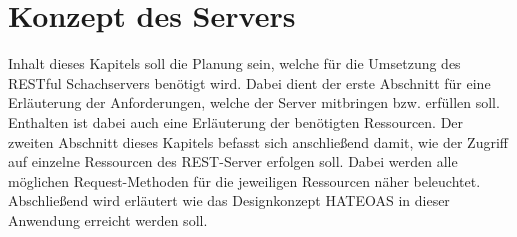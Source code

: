 
\chapter{Konzept des Servers}\label{sec:conceptServer}
Inhalt dieses Kapitels soll die Planung sein, welche für die Umsetzung des RESTful Schachservers benötigt wird. Dabei dient der erste Abschnitt für eine Erläuterung der Anforderungen, welche der Server mitbringen bzw. erfüllen soll. Enthalten ist dabei auch eine Erläuterung der benötigten Ressourcen. Der zweiten Abschnitt dieses Kapitels befasst sich anschließend damit, wie der Zugriff auf einzelne Ressourcen des REST-Server erfolgen soll. Dabei werden alle möglichen Request-Methoden für die jeweiligen Ressourcen näher beleuchtet. Abschließend wird erläutert wie das Designkonzept HATEOAS in dieser Anwendung erreicht werden soll.

